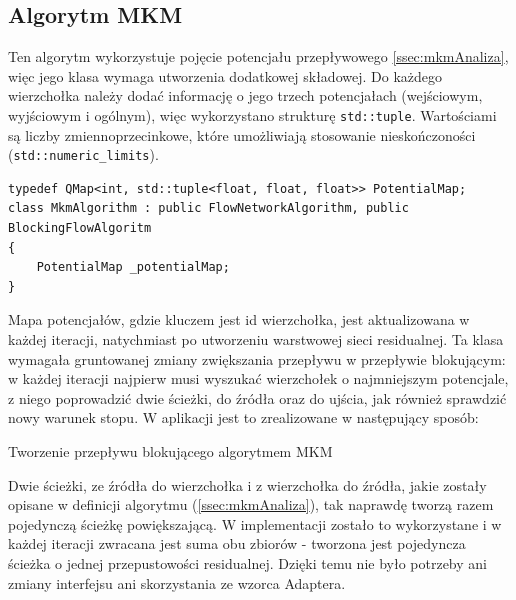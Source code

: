 \subsection{Algorytm MKM}
Ten algorytm wykorzystuje pojęcie potencjału przepływowego \ref{ssec:mkmAnaliza}, więc jego klasa wymaga utworzenia dodatkowej składowej. Do każdego wierzchołka należy dodać informację o jego trzech potencjałach (wejściowym, wyjściowym i ogólnym), więc wykorzystano strukturę \lstinline|std::tuple|. Wartościami są liczby zmiennoprzecinkowe, które umożliwiają stosowanie nieskończoności (\lstinline|std::numeric_limits|).
\begin{verbatim}
typedef QMap<int, std::tuple<float, float, float>> PotentialMap;
class MkmAlgorithm : public FlowNetworkAlgorithm, public BlockingFlowAlgoritm
{
	PotentialMap _potentialMap;
}
\end{verbatim}
Mapa potencjałów, gdzie kluczem jest id wierzchołka, jest aktualizowana w każdej iteracji, natychmiast po utworzeniu warstwowej sieci residualnej. Ta klasa wymagała gruntowanej zmiany zwiększania przepływu w przepływie blokującym: w każdej iteracji najpierw musi wyszukać wierzchołek o najmniejszym potencjale, z niego poprowadzić dwie ścieżki, do źródła oraz do ujścia, jak również sprawdzić nowy warunek stopu. W aplikacji jest to zrealizowane w następujący sposób:
\begin{algorithm}[H]
	\caption{Tworzenie przepływu blokującego algorytmem MKM}\label{mkmZwiekszeniePrzeplywuAlg}
	\begin{algorithmic}
		\Repeat
			\EndIf
			\Else
			\EndIf
		\EndProcedure
	\end{algorithmic}
\end{algorithm}
Dwie ścieżki, ze źródła do wierzchołka i z wierzchołka do źródła, jakie zostały opisane w definicji algorytmu (\ref{ssec:mkmAnaliza}), tak naprawdę tworzą razem pojedynczą ścieżkę powiększającą. W implementacji zostało to wykorzystane i w każdej iteracji zwracana jest suma obu zbiorów - tworzona jest pojedyncza ścieżka o jednej przepustowości residualnej. Dzięki temu nie było potrzeby ani zmiany interfejsu ani skorzystania ze wzorca Adaptera.\\\indent
